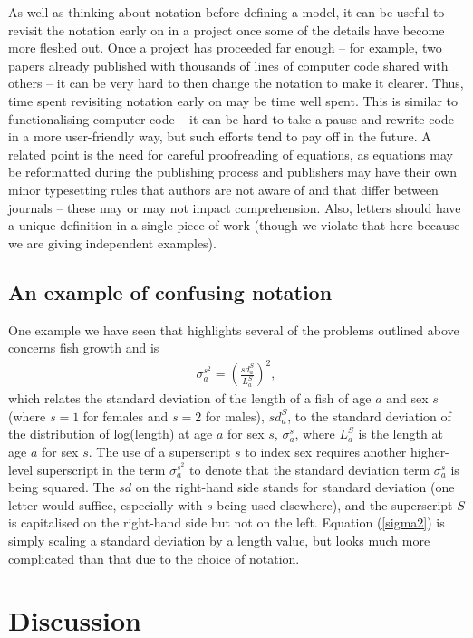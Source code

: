\documentclass[12pt]{article}
\newcommand{\eb}{\begin{eqnarray}}
\newcommand{\ee}{\end{eqnarray}}
\begin{document}
As well as thinking about notation before defining a model, it can be useful
to revisit the notation early on in a project once some of the details have
become more fleshed out. Once a project has proceeded far enough -- for example,
two papers already published with thousands of lines of computer code shared
with others -- it can be very hard to then change the notation to make it 
clearer. Thus, time spent revisiting notation early on may be time well spent.
This is similar to functionalising computer code -- it can be hard to take a 
pause and rewrite code in a more user-friendly way, but such efforts tend to 
pay off in the future. A related point is the need for careful proofreading of
equations, as equations may be reformatted during the publishing process and
publishers may have their own minor typesetting
rules that authors are not aware of and that differ between journals -- these may or may not impact comprehension.
Also, letters should have a unique definition in a single piece of work
(though we violate that here because we are giving independent examples).

\subsection*{An example of confusing notation}

One example we have seen that highlights several of the problems outlined 
above concerns fish growth and is
\eb
\sigma_a^{s^2} = \left( \frac{sd^S_a}{L^S_a} \right)^2,
\label{sigma2}
\ee
which relates the standard deviation of the length of a fish of age $a$ and sex
$s$ (where $s=1$ for females and $s=2$ for males), 
$sd^S_a$, to the standard deviation of the distribution of log(length) at 
age $a$ for sex $s$, $\sigma_a^{s}$, where $L^S_a$ is the length at age $a$
for sex $s$.  
The use of a superscript $s$ to index sex requires another higher-level 
superscript in the term $\sigma_a^{s^2}$ to denote that the standard deviation
term $\sigma_a^s$ is being squared. The $sd$ on the right-hand side stands for
standard deviation (one letter would suffice, especially with $s$ being used 
elsewhere), and the superscript $S$ is capitalised on the right-hand side but not
on the left. Equation (\ref{sigma2}) is simply scaling a standard deviation by
a length value, but looks much more complicated than that due to the choice
of notation.

\section*{Discussion}
\end{document}
